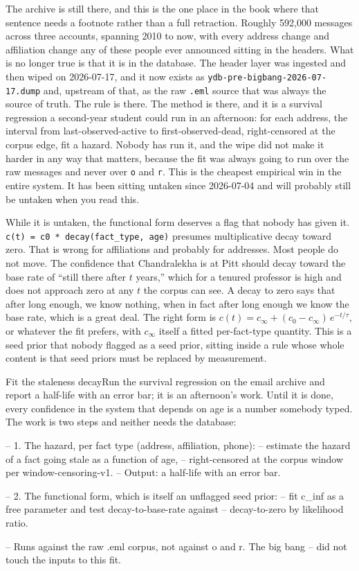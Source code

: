 The archive is still there, and this is the one place in the book where that sentence needs a footnote rather than a full retraction. Roughly 592,000 messages across three accounts, spanning 2010 to now, with every address change and affiliation change any of these people ever announced sitting in the headers. What is no longer true is that it is in the database. The header layer was ingested and then wiped on 2026-07-17, and it now exists as \texttt{ydb-pre-bigbang-2026-07-17.dump} and, upstream of that, as the raw \texttt{.eml} source that was always the source of truth. The rule is there. The method is there, and it is a survival regression a second-year student could run in an afternoon: for each address, the interval from last-observed-active to first-observed-dead, right-censored at the corpus edge, fit a hazard. Nobody has run it, and the wipe did not make it harder in any way that matters, because the fit was always going to run over the raw messages and never over \texttt{o} and \texttt{r}. This is the cheapest empirical win in the entire system. It has been sitting untaken since 2026-07-04 and will probably still be untaken when you read this.

While it is untaken, the functional form deserves a flag that nobody has given it. \texttt{c(t) = c0 * decay(fact\_type, age)} presumes multiplicative decay toward zero. That is wrong for affiliations and probably for addresses. Most people do not move. The confidence that Chandralekha is at Pitt should decay toward the base rate of ``still there after $t$ years,'' which for a tenured professor is high and does not approach zero at any $t$ the corpus can see. A decay to zero says that after long enough, we know nothing, when in fact after long enough we know the base rate, which is a great deal. The right form is $c(t) = c_\infty + (c_0 - c_\infty)\,e^{-t/\tau}$, or whatever the fit prefers, with $c_\infty$ itself a fitted per-fact-type quantity. This is a seed prior that nobody flagged as a seed prior, sitting inside a rule whose whole content is that seed priors must be replaced by measurement.

\begin{Open}{Fit the staleness decay}{Run the survival regression on the email archive and report a half-life with an error bar; it is an afternoon's work.}
Until it is done, every confidence in the system that depends on age is a number somebody typed. The work is two steps and neither needs the database:

\begin{Check}
-- 1. The hazard, per fact type (address, affiliation, phone):
--    estimate the hazard of a fact going stale as a function of age,
--    right-censored at the corpus window per window-censoring-v1.
--    Output: a half-life with an error bar.

-- 2. The functional form, which is itself an unflagged seed prior:
--    fit c_inf as a free parameter and test decay-to-base-rate against
--    decay-to-zero by likelihood ratio.

-- Runs against the raw .eml corpus, not against o and r. The big bang
-- did not touch the inputs to this fit.
\end{Check}
\end{Open}

